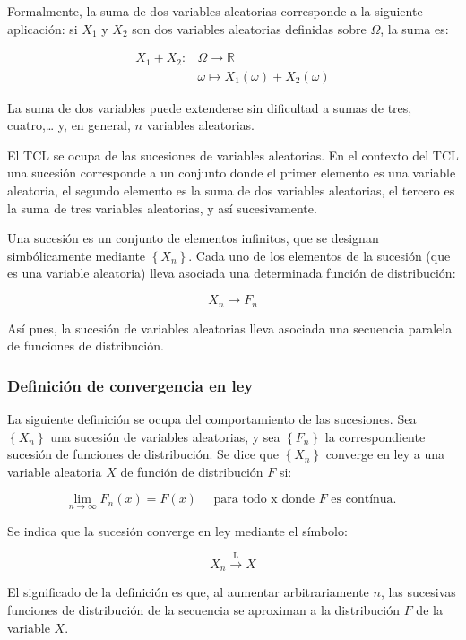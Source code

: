 \documentclass[
]{article}
\begin{document}
Formalmente, la suma de dos variables aleatorias corresponde a la siguiente aplicación: si \(X_{1}\) y \(X_{2}\) son dos variables aleatorias definidas sobre \(\Omega\), la suma es:

\[
\begin{aligned}
X_{1}+X_{2}: & \Omega \rightarrow \mathbb{R} \\
& \omega \mapsto X_{1}(\omega)+X_{2}(\omega)
\end{aligned}
\]

La suma de dos variables puede extenderse sin dificultad a sumas de tres, cuatro,\ldots{} y, en general, \(n\) variables aleatorias.

El TCL se ocupa de las sucesiones de variables aleatorias. En el contexto del TCL una sucesión corresponde a un conjunto donde el primer elemento es una variable aleatoria, el segundo elemento es la suma de dos variables aleatorias, el tercero es la suma de tres variables aleatorias, y así sucesivamente.

Una sucesión es un conjunto de elementos infinitos, que se designan simbólicamente mediante \(\left\{X_{n}\right\}\).
Cada uno de los elementos de la sucesión (que es una variable aleatoria) lleva asociada una determinada función de distribución:

\[
X_{n} \rightarrow F_{n}
\]

Así pues, la sucesión de variables aleatorias lleva asociada una secuencia paralela de funciones de distribución.

\subsubsection{Definición de convergencia en ley}\label{definiciuxf3n-de-convergencia-en-ley}

La siguiente definición se ocupa del comportamiento de las sucesiones.
Sea \(\left\{X_{n}\right\}\) una sucesión de variables aleatorias, y sea \(\left\{F_{n}\right\}\) la correspondiente sucesión de funciones de distribución. Se dice que \(\left\{X_{n}\right\}\) converge en ley a una variable aleatoria \(X\) de función de distribución \(F\) si:

\[
\lim _{n \rightarrow \infty} F_{n}(x)=F(x) \quad \text { para todo } \mathrm{x} \text { donde } F \text { es contínua. }
\]

Se indica que la sucesión converge en ley mediante el símbolo:

\[
X_{n} \stackrel{\mathrm{L}}{\rightarrow} X
\]

El significado de la definición es que, al aumentar arbitrariamente \(n\), las sucesivas funciones de distribución de la secuencia se aproximan a la distribución \(F\) de la variable \(X\).
\end{document}
